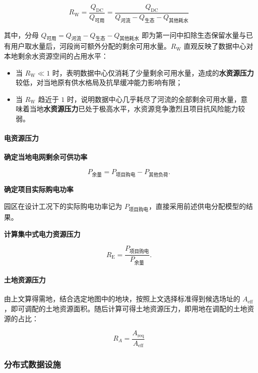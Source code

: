 \[
R_{\mathrm{W}} = \frac{Q_{\mathrm{DC}}}{Q_{\text{可用}}} = \frac{Q_{\mathrm{DC}}}{Q_{\text{河流}} - Q_{\text{生态}} - Q_{\text{其他耗水}}}
\]

其中，分母 $Q_{\text{可用}} = Q_{\text{河流}} - Q_{\text{生态}} - Q_{\text{其他耗水}}$ 即为第一问中扣除生态保留水量与已有用户取水量后，河段尚可额外分配的剩余可用水量。$R_{\mathrm{W}}$ 直观反映了数据中心对本地剩余水资源空间的占用水平：

\begin{itemize}
\item 当 $R_{\mathrm{W}} \ll 1$ 时，表明数据中心仅消耗了少量剩余可用水量，造成的\textbf{水资源压力}较低，对当地原有供水格局及抗旱缓冲能力影响有限；
\item 当 $R_{\mathrm{W}}$ 趋近于 $1$ 时，说明数据中心几乎耗尽了河流的全部剩余可用水量，意味着当地\textbf{水资源压力}已处于极高水平，水资源竞争激烈且项目抗风险能力较弱。
\end{itemize}

\paragraph{电资源压力}

\textbf{确定当地电网剩余可供功率}

\begin{equation}
P_{\text{余量}}
=P_{\text{项目购电}}-P_{\text{其他负荷}}.
\tag{1}
\end{equation}

\textbf{确定项目实际购电功率}

园区在设计工况下的实际购电功率记为 $P_{\text{项目购电}}$，直接采用前述供电分配模型的结果。

\textbf{计算集中式电力资源压力}

\begin{equation}
R_{\mathrm{E}}
=\frac{P_{\text{项目购电}}}{P_{\text{余量}}}.
\tag{2}
\end{equation}

\paragraph{土地资源压力}

由上文算得需地，结合选定地图中的地块，按照上文选择标准得到候选场址的 $A_{\mathrm{eff}}$，即可调配的土地资源面积。随后计算可得土地资源压力，即用地在调配的土地资源的占比：

\[
R_A=\frac{A_{\mathrm{req}}}{A_\mathrm{eff}}
\]

\subsubsection{分布式数据设施}

